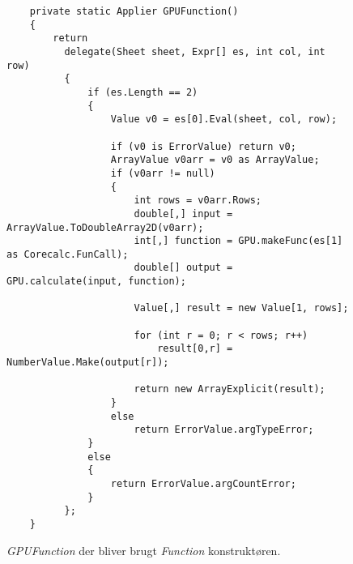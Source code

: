 \begin{figure}[!ht]
    \centering
    \lstset{style=sharpc}
	\begin{lstlisting}
    private static Applier GPUFunction()
    {
        return
          delegate(Sheet sheet, Expr[] es, int col, int row)
          {
              if (es.Length == 2)
              {
                  Value v0 = es[0].Eval(sheet, col, row);
                  
                  if (v0 is ErrorValue) return v0;
                  ArrayValue v0arr = v0 as ArrayValue;
                  if (v0arr != null)
                  {
                      int rows = v0arr.Rows;
                      double[,] input = ArrayValue.ToDoubleArray2D(v0arr);
                      int[,] function = GPU.makeFunc(es[1] as Corecalc.FunCall);
                      double[] output = GPU.calculate(input, function);

                      Value[,] result = new Value[1, rows];

                      for (int r = 0; r < rows; r++)
                          result[0,r] = NumberValue.Make(output[r]);

                      return new ArrayExplicit(result);
                  }
                  else
                      return ErrorValue.argTypeError;
              }
              else
              {
                  return ErrorValue.argCountError;
              }
          };
    }
	\end{lstlisting}
    \caption{\textit{GPUFunction} der bliver brugt  \textit{Function} konstruktøren.}
    \label{fig:Corecalc_FC_2}
\end{figure}
